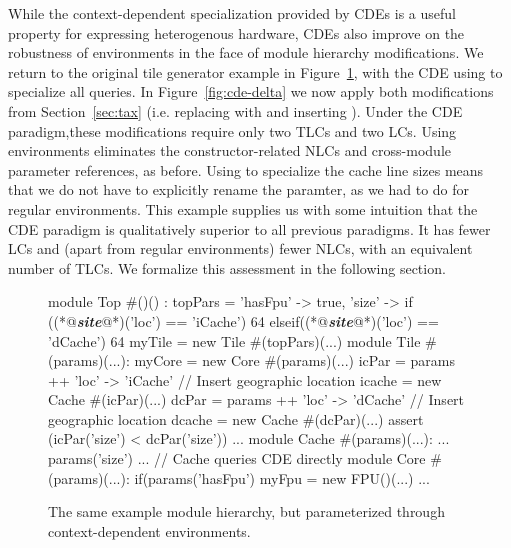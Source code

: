 While the context-dependent specialization provided by CDEs is a useful property for expressing heterogenous hardware, CDEs also improve on the robustness of environments
in the face of module hierarchy modifications.
We return to the original tile generator example in Figure~\ref{fig:cde}, with the CDE  using  to specialize all  queries.
In Figure~\ref{fig:cde-delta} we now apply both modifications from Section~\ref{sec:tax} (i.e. replacing  with  and inserting ).
Under the CDE paradigm,these modifications require only two TLCs and two LCs.
Using environments eliminates the constructor-related NLCs and cross-module parameter references, as before.
Using  to specialize the cache line sizes means that we do not have to explicitly rename the  paramter, as we had to do for regular environments.
This example supplies us with some intuition that the CDE paradigm is qualitatively superior to all previous paradigms.
It has fewer LCs and (apart from regular environments) fewer NLCs, with an equivalent number of TLCs.
We formalize this assessment in the following section.

\begin{figure}
\centering
\begin{phdl}
module Top #()() :
  topPars = {'hasFpu' -> true,
             'size' -> if    ((*@\textcolor[rgb]{1,0.5,0}{\textbf{\textit{site}}}@*)('loc') == 'iCache') 64 
                       elseif((*@\textcolor[rgb]{1,0.5,0}{\textbf{\textit{site}}}@*)('loc') == 'dCache') 64}
  myTile = new Tile #(topPars)(...)
module Tile #(params)(...):
  myCore = new Core #(params)(...)
  icPar = params ++ {'loc' -> 'iCache'} // Insert geographic location
  icache = new Cache #(icPar)(...)
  dcPar = params ++ {'loc' -> 'dCache'} // Insert geographic location
  dcache = new Cache #(dcPar)(...)
  assert (icPar('size') < dcPar('size')) ...
module Cache #(params)(...):
  ... params('size') ... // Cache queries CDE directly
module Core #(params)(...):
  if(params('hasFpu') myFpu = new FPU()(...) ...
\end{phdl} 
\caption{The same example module hierarchy, but parameterized through context-dependent environments.}
\label{fig:cde}
\end{figure}

